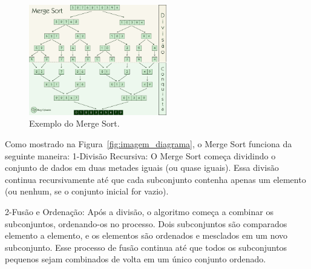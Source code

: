  \begin{figure}[H]
    \centering
    \includegraphics[width = 6cm]{Imagens/Merge Sort/diagrama-merge-sort.png}
    \caption{Exemplo do Merge Sort\cite{cyberini2018mergesort}. }
    \label{imagem_digrama}
\end{figure}

Como mostrado na Figura~\ref{fig:imagem_diagrama}, o Merge Sort funciona da seguinte maneira: 
1-Divisão Recursiva: O Merge Sort começa dividindo o conjunto de dados em duas metades iguais (ou quase iguais). Essa divisão continua recursivamente até que cada subconjunto contenha apenas um elemento (ou nenhum, se o conjunto inicial for vazio).

2-Fusão e Ordenação: Após a divisão, o algoritmo começa a combinar os subconjuntos, ordenando-os no processo. Dois subconjuntos são comparados elemento a elemento, e os elementos são ordenados e mesclados em um novo subconjunto. Esse processo de fusão continua até que todos os subconjuntos pequenos sejam combinados de volta em um único conjunto ordenado.
